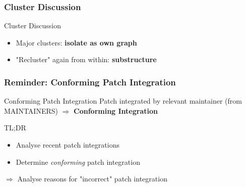 \documentclass{beamer}
\begin{document}
	\begin{frame}
	\frametitle{Cluster Discussion}
		\begin{block}{Cluster Discussion}
			\begin{itemize}
				\item Major clusters: \textbf{isolate as own graph}
				\item "Recluster" again from within: \textbf{substructure}
			\end{itemize}
		\end{block}
		
	\end{frame}

	\begin{frame}
	\frametitle{Reminder: Conforming Patch Integration} %
		\begin{alertblock}{Conforming Patch Integration}
			Patch integrated by relevant maintainer (from MAINTAINERS) $\Rightarrow$ \textbf{Conforming Integration}
		\end{alertblock}

		\begin{block}{TL;DR}
			\begin{itemize}
				\item Analyse recent patch integrations
				\item Determine \textit{conforming} patch integration
			\end{itemize}
		\end{block}
		$\Rightarrow$ Analyse reasons for "incorrect" patch integration
	\end{frame}
\end{document}

